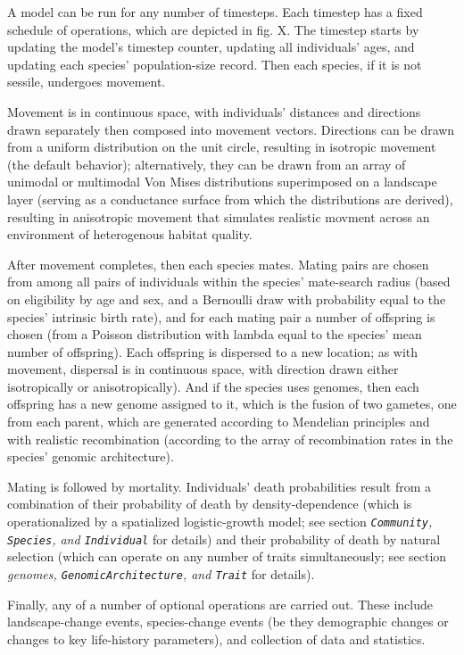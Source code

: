 ﻿\documentclass{article}
\begin{document}
A model can be run for any number of timesteps. Each timestep has a fixed schedule
of operations, which are depicted in fig. X. The timestep starts by updating the
model's timestep counter, updating all individuals' ages, and updating each species'
population-size record. Then each species, if it is not sessile, undergoes movement. 

Movement is in continuous space, with individuals' distances
and directions drawn separately then composed into movement vectors. Directions can be
drawn from a uniform distribution on the unit circle, resulting in isotropic movement
(the default behavior); alternatively, they can be drawn from an array
of unimodal or multimodal Von Mises distributions superimposed on
a landscape layer (serving as a conductance surface from which the distributions
are derived), resulting in anisotropic movement that simulates realistic movment 
across an environment of heterogenous habitat quality.

After movement completes, then each species mates.
Mating pairs are chosen from among all pairs of 
individuals within the species' mate-search radius
(based on eligibility by age and sex, and a Bernoulli draw with probability equal
to the species' intrinsic birth rate), and for each mating pair a number of offspring
is chosen (from a Poisson distribution with lambda equal to the species' mean number
of offspring). Each offspring is dispersed to a new location; as with movement, dispersal
is in continuous space, with direction drawn either isotropically or
anisotropically). And if the species uses genomes, then each offspring has a new genome
assigned to it, which is the fusion of two gametes, one from each parent, which are
generated according to Mendelian principles and with realistic recombination (according
to the array of recombination rates in the species' genomic architecture).

Mating is followed by mortality. Individuals' death probabilities result from
a combination of their probability of death by density-dependence (which is
operationalized by a spatialized logistic-growth model; see section
\emph{\texttt{Community}, \texttt{Species}, and \texttt{Individual}} for details)
and their probability of death by natural selection (which can operate on any number
of traits simultaneously; see section
\emph{genomes, \texttt{GenomicArchitecture}, and \texttt{Trait}} for details). 

Finally, any of a number of optional operations are carried out. These include
landscape-change events, species-change events (be they demographic changes or
changes to key life-history parameters), and collection of data and statistics.
\end{document}
